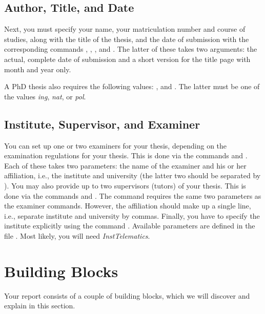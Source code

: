 \subsection{Author, Title, and Date}

Next, you must specify your name, your matriculation number and course of studies, along with the title of the thesis, and the date of submission with the corresponding commands ,  , , and . The latter of these takes two arguments: the actual, complete date of submission and a short version for the title page with month and year only.

A PhD thesis also requires the following values: 
,  and . The latter must be one of the values \emph{ing}, \emph{nat}, or \emph{pol}.

\subsection{Institute, Supervisor, and Examiner}

You can set up one or two examiners for your thesis, depending on the examination regulations for your thesis. This is done via the commands
 and . Each of these takes two parameters: the name of the examiner and his or her affiliation, i.e., the institute and university (the latter two should be separated by ).
You may also provide up to two supervisors (tutors) of your thesis. This is done via the commands  and . The command requires the same two parameters as the examiner commands. However, the affiliation should make up a single line, i.e., separate institute and university by commas.
Finally, you have to specify the institute explicitly using the command . Available parameters are defined in the file . Most likely, you will need \emph{InstTelematics}.


\section{Building Blocks}

Your report consists of a couple of building blocks, which we will discover and explain in this section.


